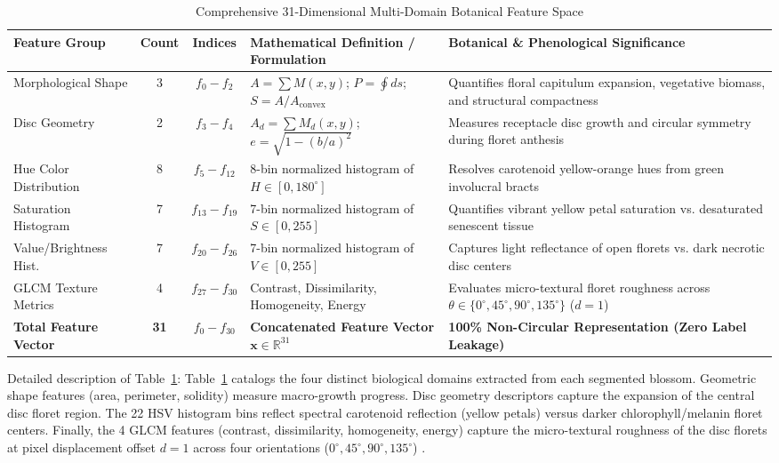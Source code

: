 \documentclass{ieeeaccess}
\begin{document}
\begin{table}[!t]
\caption{Comprehensive 31-Dimensional Multi-Domain Botanical Feature Space}
\label{tab:feature_specifications}
\centering
\begin{tabular*}{\textwidth}{@{\extracolsep{\fill}}lcclp{6.8cm}@{}}
\toprule
\textbf{Feature Group} & \textbf{Count} & \textbf{Indices} & \textbf{Mathematical Definition / Formulation} & \textbf{Botanical \& Phenological Significance} \\
\midrule
Morphological Shape    & 3  & $f_0 - f_2$   & $A = \sum M(x,y)$; $P = \oint ds$; $S = A / A_{\text{convex}}$ & Quantifies floral capitulum expansion, vegetative biomass, and structural compactness \\
Disc Geometry          & 2  & $f_3 - f_4$   & $A_d = \sum M_d(x,y)$; $e = \sqrt{1 - (b/a)^2}$ & Measures receptacle disc growth and circular symmetry during floret anthesis \\
Hue Color Distribution & 8  & $f_5 - f_{12}$ & 8-bin normalized histogram of $H \in [0, 180^\circ]$ & Resolves carotenoid yellow-orange hues from green involucral bracts \\
Saturation Histogram   & 7  & $f_{13} - f_{19}$ & 7-bin normalized histogram of $S \in [0, 255]$ & Quantifies vibrant yellow petal saturation vs. desaturated senescent tissue \\
Value/Brightness Hist. & 7  & $f_{20} - f_{26}$ & 7-bin normalized histogram of $V \in [0, 255]$ & Captures light reflectance of open florets vs. dark necrotic disc centers \\
GLCM Texture Metrics   & 4  & $f_{27} - f_{30}$ & Contrast, Dissimilarity, Homogeneity, Energy & Evaluates micro-textural floret roughness across $\theta \in \{0^\circ, 45^\circ, 90^\circ, 135^\circ\}$ ($d=1$) \\
\midrule
\textbf{Total Feature Vector} & \textbf{31} & $f_0 - f_{30}$ & \textbf{Concatenated Feature Vector $\mathbf{x} \in \mathbb{R}^{31}$} & \textbf{100\% Non-Circular Representation (Zero Label Leakage)} \\
\bottomrule
\end{tabular*}
\end{table}

Detailed description of Table~\ref{tab:feature_specifications}: Table~\ref{tab:feature_specifications} catalogs the four distinct biological domains extracted from each segmented blossom. Geometric shape features (area, perimeter, solidity) measure macro-growth progress. Disc geometry descriptors capture the expansion of the central disc floret region. The 22 HSV histogram bins reflect spectral carotenoid reflection (yellow petals) versus darker chlorophyll/melanin floret centers. Finally, the 4 GLCM features (contrast, dissimilarity, homogeneity, energy) capture the micro-textural roughness of the disc florets at pixel displacement offset $d=1$ across four orientations ($0^\circ, 45^\circ, 90^\circ, 135^\circ$) \cite{haralick1973textural}.
\end{document}
